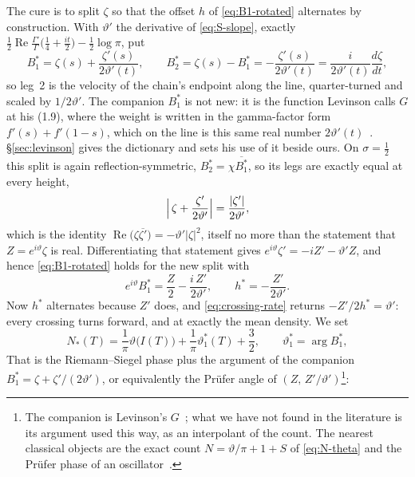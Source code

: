 \documentclass[11pt]{article}
\theoremstyle{definition}
\begin{document}
The cure is to split $\zeta$ so that the offset $h$ of \eqref{eq:B1-rotated}
alternates by construction. With $\vartheta'$ the derivative of \eqref{eq:S-slope}, exactly
$\tfrac12\operatorname{Re}\tfrac{\Gamma'}{\Gamma}\bigl(\tfrac14+\tfrac{it}{2}\bigr)-\tfrac12\log\pi$,
put
\begin{equation}\label{eq:vel-split}
B_1^{\ast}=\zeta(s)+\frac{\zeta'(s)}{2\vartheta'(t)},\qquad
B_2^{\ast}=\zeta(s)-B_1^{\ast}=-\frac{\zeta'(s)}{2\vartheta'(t)}
=\frac{i}{2\vartheta'(t)}\frac{d\zeta}{dt},
\end{equation}
so leg~2 is the velocity of the chain's endpoint along the line, quarter-turned
and scaled by $1/2\vartheta'$. The companion $B_1^{\ast}$ is not new: it is the
function Levinson calls $G$ at his (1.9), where the weight is written in the
gamma-factor form $f'(s)+f'(1-s)$, which on the line is this same real number
$2\vartheta'(t)$~\cite{Levinson1974}. \S\ref{sec:levinson} gives the dictionary
and sets his use of it beside ours. On $\sigma=\tfrac12$ this split is again
reflection-symmetric, $B_2^{\ast}=\chi\overline{B_1^{\ast}}$, so its legs are
exactly equal at every height,
\begin{equation}\label{eq:vel-legs}
\Bigl|\,\zeta+\frac{\zeta'}{2\vartheta'}\Bigr|=\frac{|\zeta'|}{2\vartheta'},
\end{equation}
which is the identity $\operatorname{Re}\bigl(\zeta\overline{\zeta'}\bigr)
=-\vartheta'|\zeta|^{2}$, itself no more than the statement that
$Z=e^{i\vartheta}\zeta$ is real. Differentiating that statement gives
$e^{i\vartheta}\zeta'=-iZ'-\vartheta'Z$, and hence \eqref{eq:B1-rotated} holds for the
new split with
\begin{equation}\label{eq:h-star}
e^{i\vartheta}B_1^{\ast}=\frac{Z}{2}-\frac{i\,Z'}{2\vartheta'},
\qquad h^{\ast}=-\frac{Z'}{2\vartheta'} .
\end{equation}
Now $h^{\ast}$ alternates because $Z'$ does, and \eqref{eq:crossing-rate}
returns $-Z'/2h^{\ast}=\vartheta'$: every crossing turns forward, and at exactly
the mean density. We set
\begin{equation}\label{eq:N-star}
N_{\ast}(T)=\frac{1}{\pi}\vartheta\bigl(I(T)\bigr)
+\frac{1}{\pi}\vartheta_1^{\ast}(T)+\frac32,
\qquad \vartheta_1^{\ast}=\arg B_1^{\ast},
\end{equation}
That is the Riemann--Siegel phase plus the argument of the companion
$B_1^{\ast}=\zeta+\zeta'/(2\vartheta')$, or equivalently the Pr\"ufer angle
of $(Z,\,Z'/\vartheta')$\footnote{The companion is Levinson's
$G$~\cite{Levinson1974}; what we have not found in the literature is its
argument used this way, as an interpolant of the count. The nearest classical
objects are the exact count $N=\vartheta/\pi+1+S$ of \eqref{eq:N-theta} and the
Pr\"ufer phase of an oscillator~\cite{Prufer1926}.}:
\end{document}
